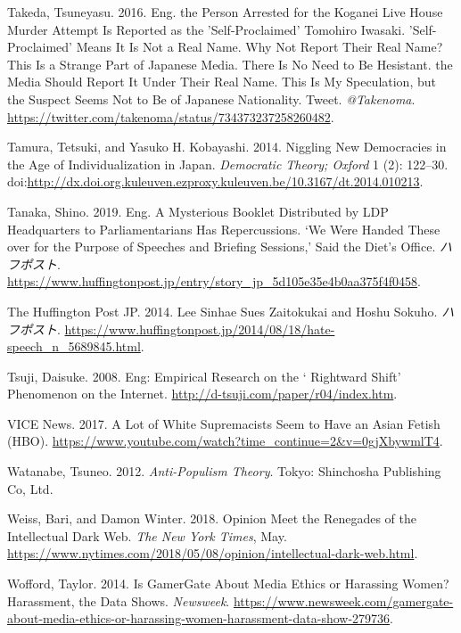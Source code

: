 \documentclass[10pt,british,A4paper,,openany]{memoir}
\begin{document}
\hypertarget{ref-takeda_eng._2016}{}
Takeda, Tsuneyasu. 2016. Eng. the Person Arrested for the Koganei Live
House Murder Attempt Is Reported as the 'Self-Proclaimed' Tomohiro
Iwasaki. 'Self-Proclaimed' Means It Is Not a Real Name. Why Not Report
Their Real Name? This Is a Strange Part of Japanese Media. There Is No
Need to Be Hesistant. the Media Should Report It Under Their Real Name.
This Is My Speculation, but the Suspect Seems Not to Be of Japanese
Nationality. Tweet. \emph{@Takenoma}.
\url{https://twitter.com/takenoma/status/734373237258260482}.

\hypertarget{ref-tamura_niggling_2014}{}
Tamura, Tetsuki, and Yasuko H. Kobayashi. 2014. Niggling New Democracies
in the Age of Individualization in Japan. \emph{Democratic Theory;
Oxford} 1 (2): 122--30.
doi:\href{https://doi.org/http://dx.doi.org.kuleuven.ezproxy.kuleuven.be/10.3167/dt.2014.010213}{http://dx.doi.org.kuleuven.ezproxy.kuleuven.be/10.3167/dt.2014.010213}.

\hypertarget{ref-tanaka_eng._2019}{}
Tanaka, Shino. 2019. Eng. A Mysterious Booklet Distributed by LDP
Headquarters to Parliamentarians Has Repercussions. `We Were Handed
These over for the Purpose of Speeches and Briefing Sessions,' Said the
Diet's Office. \emph{ハフポスト}.
\url{https://www.huffingtonpost.jp/entry/story_jp_5d105e35e4b0aa375f4f0458}.

\hypertarget{ref-the_huffington_post_jp_lee_2014}{}
The Huffington Post JP. 2014. Lee Sinhae Sues Zaitokukai and Hoshu
Sokuho. \emph{ハフポスト}.
\url{https://www.huffingtonpost.jp/2014/08/18/hate-speech_n_5689845.html}.

\hypertarget{ref-tsuji_eng:_2008}{}
Tsuji, Daisuke. 2008. Eng: Empirical Research on the ` Rightward Shift'
Phenomenon on the Internet.
\url{http://d-tsuji.com/paper/r04/index.htm}.

\hypertarget{ref-vice_news_lot_2017}{}
VICE News. 2017. A Lot of White Supremacists Seem to Have an Asian
Fetish (HBO).
\url{https://www.youtube.com/watch?time_continue=2\&v=0gjXbywmlT4}.

\hypertarget{ref-watanabe_anti-populism_2012}{}
Watanabe, Tsuneo. 2012. \emph{Anti-Populism Theory}. Tokyo: Shinchosha
Publishing Co, Ltd.

\hypertarget{ref-weiss_opinion_2018}{}
Weiss, Bari, and Damon Winter. 2018. Opinion Meet the Renegades of the
Intellectual Dark Web. \emph{The New York Times}, May.
\url{https://www.nytimes.com/2018/05/08/opinion/intellectual-dark-web.html}.

\hypertarget{ref-wofford_is_2014}{}
Wofford, Taylor. 2014. Is GamerGate About Media Ethics or Harassing
Women? Harassment, the Data Shows. \emph{Newsweek}.
\url{https://www.newsweek.com/gamergate-about-media-ethics-or-harassing-women-harassment-data-show-279736}.
\end{document}
